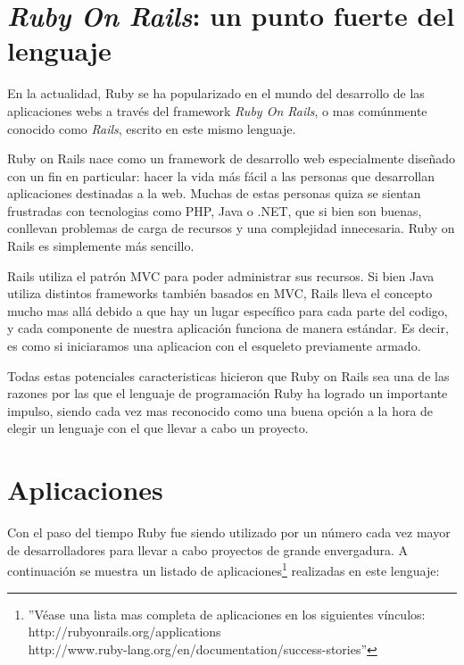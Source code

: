 \documentclass{article}
\begin{document}
\section{\textit{Ruby On Rails}: un punto fuerte del lenguaje}

	En la actualidad, Ruby se ha popularizado en el mundo del desarrollo de las aplicaciones webs a través del framework \textit{Ruby On Rails}, o mas comúnmente conocido como \textit{Rails}, escrito en este mismo lenguaje.
	\par
	Ruby on Rails nace como un framework de desarrollo web especialmente diseñado con un fin en particular: hacer la vida más fácil a las personas que desarrollan aplicaciones destinadas a la web. Muchas de estas personas quiza se sientan frustradas con tecnologias como PHP, Java o .NET, que si bien son buenas, conllevan problemas de carga de recursos y una complejidad innecesaria. Ruby on Rails es simplemente más sencillo.
	\par
	Rails utiliza el patrón MVC para poder administrar sus recursos. Si bien Java utiliza distintos frameworks también basados en MVC, Rails lleva el concepto mucho mas allá debido a que hay un lugar específico para cada parte del codigo, y cada componente de nuestra aplicación funciona de manera estándar. Es decir, es como si iniciaramos una aplicacion con el esqueleto previamente armado.
	\par
	Todas estas potenciales caracteristicas hicieron que Ruby on Rails sea una de las razones por las que el lenguaje de programación Ruby ha logrado un importante impulso, siendo cada vez mas reconocido como una buena opción a la hora de elegir un lenguaje con el que llevar a cabo un proyecto.




\section{Aplicaciones}

Con el paso del tiempo Ruby fue siendo utilizado por un número cada vez mayor de desarrolladores para llevar a cabo proyectos de grande envergadura. A continuación se muestra un listado de aplicaciones\footnote{''Véase una lista mas completa de aplicaciones en los siguientes vínculos: http://rubyonrails.org/applications\\http://www.ruby-lang.org/en/documentation/success-stories''} realizadas en este lenguaje:
\bigskip\\
\end{document}
